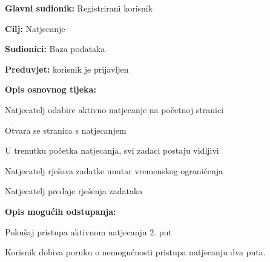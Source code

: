 					
					
					\noindent {}
					\begin{packed_item}
						
						\item \textbf{Glavni sudionik: } Registrirani korisnik
						\item  \textbf{Cilj:} Natjecanje
						\item  \textbf{Sudionici:} Baza podataka
						\item  \textbf{Preduvjet:}  korisnik je prijavljen
						\item  \textbf{Opis osnovnog tijeka:}
						
						\item[] \begin{packed_enum}
							\item Natjecatelj odabire aktivno natjecanje na početnoj stranici
							\item Otvara se stranica s natjecanjem
							\item U trenutku početka natjecanja, svi zadaci postaju vidljivi
							\item Natjecatelj rješava zadatke unutar vremenskog ograničenja
							\item Natjecatelj predaje rješenja zadataka
							
						\end{packed_enum}
						\item  \textbf{Opis mogućih odstupanja:}
						\item[] \begin{packed_item}
							
							\item[3.a] Pokušaj pristupa aktivnom natjecanju 2. put
							\item[] \begin{packed_enum}
								\item Korisnik dobiva poruku o nemogućnosti pristupa natjecanju dva puta.
							\end{packed_enum}
							
						\end{packed_item}
					\end{packed_item}


